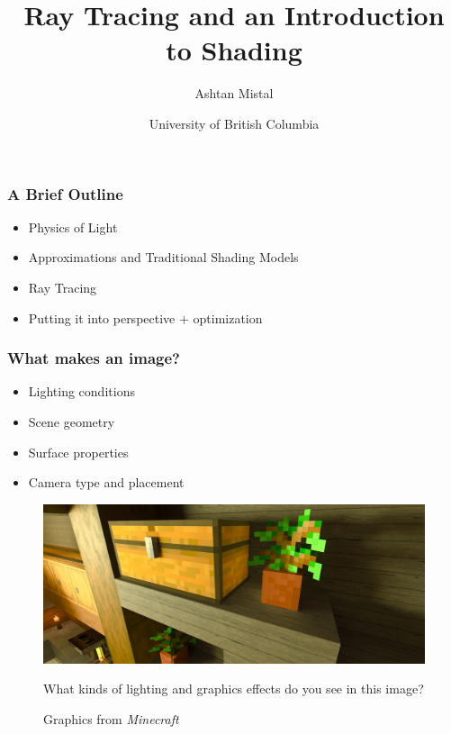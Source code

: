 \documentclass[12pt]{beamer}
\title{Ray Tracing and an Introduction to Shading}
\author{Ashtan Mistal}
\date{University of British Columbia}
\begin{document}
  \begin{frame}
    \titlepage
  \end{frame}

  \begin{frame}
    \frametitle{A Brief Outline}
    \begin{itemize}
      \item Physics of Light
      \item Approximations and Traditional Shading Models
      \item Ray Tracing
      \item Putting it into perspective + optimization
    \end{itemize}
  \end{frame}

  \begin{frame}
    \frametitle{What makes an image?}
    \begin{itemize}
      \item Lighting conditions
      \item Scene geometry
      \item Surface properties
      \item Camera type and placement
    \end{itemize}

  \end{frame}

  \begin{frame}

    \begin{figure}
      \centering
      \includegraphics[width=\textwidth]{minecraft.jpg}
      \caption{Graphics from \textit{Minecraft}}\label{fig:minecraft}

      What kinds of lighting and graphics effects do you see in this image?
    \end{figure}
  \end{frame}
\end{document}
